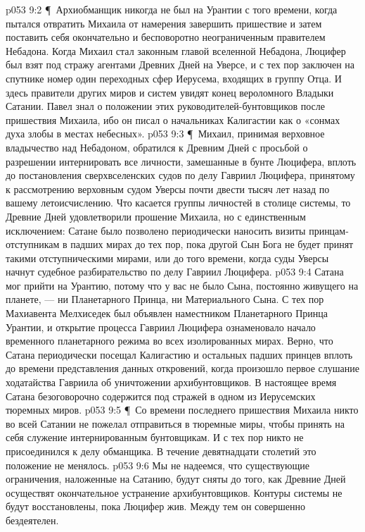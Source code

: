 \vs p053 9:2 \P\ Архиобманщик никогда не был на Урантии с того времени, когда пытался отвратить Михаила от намерения завершить пришествие и затем поставить себя окончательно и бесповоротно неограниченным правителем Небадона. Когда Михаил стал законным главой вселенной Небадона, Люцифер был взят под стражу агентами Древних Дней на Уверсе, и с тех пор заключен на спутнике номер один переходных сфер Иерусема, входящих в группу Отца. И здесь правители других миров и систем увидят конец вероломного Владыки Сатании. Павел знал о положении этих руководителей\hyp{}бунтовщиков после пришествия Михаила, ибо он писал о начальниках Калигастии как о «сонмах духа злобы в местах небесных».
\vs p053 9:3 \P\ Михаил, принимая верховное владычество над Небадоном, обратился к Древним Дней с просьбой о разрешении интернировать все личности, замешанные в бунте Люцифера, вплоть до постановления сверхвселенских судов по делу Гавриил  Люцифера, принятому к рассмотрению верховным судом Уверсы почти двести тысяч лет назад по вашему летоисчислению. Что касается группы личностей в столице системы, то Древние Дней удовлетворили прошение Михаила, но с единственным исключением: Сатане было позволено периодически наносить визиты принцам\hyp{}отступникам в падших мирах до тех пор, пока другой Сын Бога не будет принят такими отступническими мирами, или до того времени, когда суды Уверсы начнут судебное разбирательство по делу Гавриил  Люцифера.
\vs p053 9:4 Сатана мог прийти на Урантию, потому что у вас не было Сына, постоянно живущего на планете, --- ни Планетарного Принца, ни Материального Сына. С тех пор Махиавента Мелхиседек был объявлен наместником Планетарного Принца Урантии, и открытие процесса Гавриил  Люцифера ознаменовало начало временного планетарного режима во всех изолированных мирах. Верно, что Сатана периодически посещал Калигастию и остальных падших принцев вплоть до времени представления данных откровений, когда произошло первое слушание ходатайства Гавриила об уничтожении архибунтовщиков. В настоящее время Сатана безоговорочно содержится под стражей в одном из Иерусемских тюремных миров.
\vs p053 9:5 \P\ Со времени последнего пришествия Михаила никто во всей Сатании не пожелал отправиться в тюремные миры, чтобы принять на себя служение интернированным бунтовщикам. И с тех пор никто не присоединился к делу обманщика. В течение девятнадцати столетий это положение не менялось.
\vs p053 9:6 Мы не надеемся, что существующие ограничения, наложенные на Сатанию, будут сняты до того, как Древние Дней осуществят окончательное устранение архибунтовщиков. Контуры системы не будут восстановлены, пока Люцифер жив. Между тем он совершенно бездеятелен.
